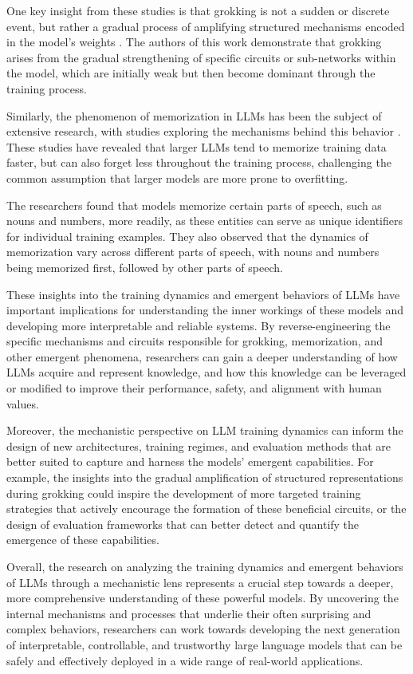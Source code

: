 \documentclass[11pt]{article}
\begin{document}
One key insight from these studies is that grokking is not a sudden or discrete event, but rather a gradual process of amplifying structured mechanisms encoded in the model's weights \cite{ref260}. The authors of this work demonstrate that grokking arises from the gradual strengthening of specific circuits or sub-networks within the model, which are initially weak but then become dominant through the training process.

Similarly, the phenomenon of memorization in LLMs has been the subject of extensive research, with studies exploring the mechanisms behind this behavior \cite{ref261,ref262}. These studies have revealed that larger LLMs tend to memorize training data faster, but can also forget less throughout the training process, challenging the common assumption that larger models are more prone to overfitting.

The researchers found that models memorize certain parts of speech, such as nouns and numbers, more readily, as these entities can serve as unique identifiers for individual training examples. They also observed that the dynamics of memorization vary across different parts of speech, with nouns and numbers being memorized first, followed by other parts of speech.

These insights into the training dynamics and emergent behaviors of LLMs have important implications for understanding the inner workings of these models and developing more interpretable and reliable systems. By reverse-engineering the specific mechanisms and circuits responsible for grokking, memorization, and other emergent phenomena, researchers can gain a deeper understanding of how LLMs acquire and represent knowledge, and how this knowledge can be leveraged or modified to improve their performance, safety, and alignment with human values.

Moreover, the mechanistic perspective on LLM training dynamics can inform the design of new architectures, training regimes, and evaluation methods that are better suited to capture and harness the models' emergent capabilities. For example, the insights into the gradual amplification of structured representations during grokking could inspire the development of more targeted training strategies that actively encourage the formation of these beneficial circuits, or the design of evaluation frameworks that can better detect and quantify the emergence of these capabilities.

Overall, the research on analyzing the training dynamics and emergent behaviors of LLMs through a mechanistic lens represents a crucial step towards a deeper, more comprehensive understanding of these powerful models. By uncovering the internal mechanisms and processes that underlie their often surprising and complex behaviors, researchers can work towards developing the next generation of interpretable, controllable, and trustworthy large language models that can be safely and effectively deployed in a wide range of real-world applications.
\end{document}
